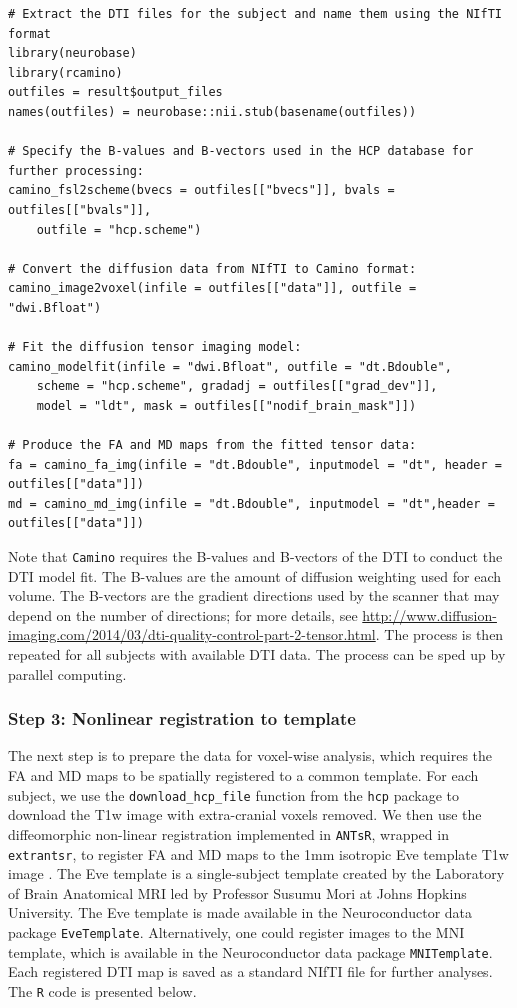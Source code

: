 \documentclass[]{elsarticle} %
\begin{document}
\color{blue}
\begin{verbatim}
# Extract the DTI files for the subject and name them using the NIfTI format
library(neurobase)
library(rcamino)
outfiles = result$output_files
names(outfiles) = neurobase::nii.stub(basename(outfiles))

# Specify the B-values and B-vectors used in the HCP database for further processing:
camino_fsl2scheme(bvecs = outfiles[["bvecs"]], bvals = outfiles[["bvals"]],
    outfile = "hcp.scheme")

# Convert the diffusion data from NIfTI to Camino format:
camino_image2voxel(infile = outfiles[["data"]], outfile = "dwi.Bfloat")

# Fit the diffusion tensor imaging model:
camino_modelfit(infile = "dwi.Bfloat", outfile = "dt.Bdouble", 
    scheme = "hcp.scheme", gradadj = outfiles[["grad_dev"]],
    model = "ldt", mask = outfiles[["nodif_brain_mask"]])

# Produce the FA and MD maps from the fitted tensor data:
fa = camino_fa_img(infile = "dt.Bdouble", inputmodel = "dt", header = outfiles[["data"]])
md = camino_md_img(infile = "dt.Bdouble", inputmodel = "dt",header = outfiles[["data"]])
\end{verbatim}
\color{black}
Note that \texttt{Camino} requires the B-values and B-vectors of the DTI to conduct the DTI model fit. The B-values are the amount of diffusion weighting used for each volume. The B-vectors are the gradient directions used by the scanner that may depend on the number of directions; for more details, see \url{http://www.diffusion-imaging.com/2014/03/dti-quality-control-part-2-tensor.html}. The process is then repeated for all subjects with available DTI data. The process can be sped up by  parallel computing.

\subsubsection{Step 3: Nonlinear registration to template} 
The next step is to prepare the data for voxel-wise analysis, which requires the FA and MD maps to be spatially registered to a common template. For each subject, we use the \texttt{download\_hcp\_file} function from the \texttt{hcp} package to download the T1w image with extra-cranial voxels removed. We then use the diffeomorphic non-linear registration implemented in \texttt{ANTsR}, wrapped in \texttt{extrantsr}, to register FA and MD maps to the 1mm isotropic Eve template T1w image \citep{eve}. The Eve template is a single-subject template created by the Laboratory of Brain Anatomical MRI led by Professor Susumu Mori at Johns Hopkins University. The Eve template is made available in the Neuroconductor data package \texttt{EveTemplate}. Alternatively, one could register  images to the MNI template, which is available in the Neuroconductor data package \texttt{MNITemplate}.   Each registered DTI map is saved as a standard NIfTI file for further analyses. The \texttt{R} code is presented below.
\end{document}
